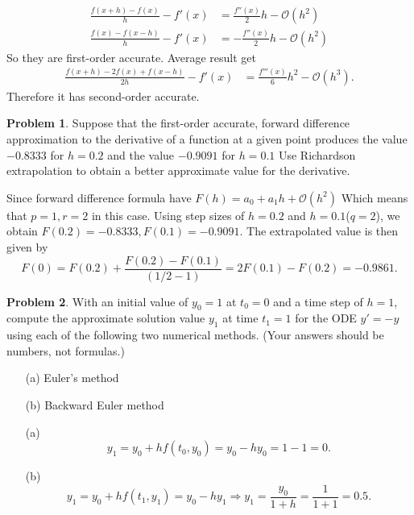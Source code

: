 \documentclass[a4paper]{book}
\makeatletter
\newenvironment{sol}[1][\solname]{\par
  \pushQED{\qed}
  \normalfont \topsep6\p@\@plus6\p@\relax
  \trivlist
  \item[\hskip\labelsep
        \itshape
    #1\@addpunct{.}]\ignorespaces
}{\popQED\endtrivlist\@endpefalse}
\providecommand{\solname}{Solution}
\numberwithin{equation}{chapter}
\theoremstyle{definition}
\newtheorem{pro}{Problem}
\makeatother
\begin{document}
\begin{sol}
    \begin{align*}
        \frac{f(x + h) - f(x)}{h} - f'(x) &= \frac{f''(x)}{2}h - \mathcal{O}(h^2) \\
        \frac{f(x) - f(x - h)}{h} - f'(x) &= - \frac{f''(x)}{2}h - \mathcal{O}(h^2)
    \end{align*}
    So they are first-order accurate. Average result get 
    \begin{align*}
        \frac{f(x + h) - 2f(x) + f(x - h)}{2h} - f'(x) &= \frac{f'''(x)}{6}h^2 - \mathcal{O}(h^3).
    \end{align*}
    Therefore it has second-order accurate.
\end{sol}

\begin{pro}
    Suppose that the first-order accurate, forward difference 
    approximation to the derivative of a function at a given point
    produces the value $-0.8333$ for $h = 0.2$ and the value 
    $-0.9091$ for $h = 0.1$ Use Richardson extrapolation to obtain a better
    approximate value for the derivative.
\end{pro}
\begin{sol}
    Since forward difference formula have $F(h) = a_0 + 
    a_1 h +\mathcal{O}(h^2)$ Which means that $p = 1, r = 2$ in 
    this case. Using step sizes of $h = 0.2$ and $h = 0.1$($ q = 2$),
    we obtain $F(0.2) = -0.8333, F(0.1) = -0.9091$. The 
    extrapolated value is then given by 
    \[F(0) = F(0.2) + \frac{F(0.2) - F(0.1)}{(1/2 - 1)} = 2F(0.1) - F(0.2) = -0.9861.\]
\end{sol}

\begin{pro}
    With an initial value of $y_0=1$ at $t_0=0$
    and a time step of $h=1$,
    compute the approximate solution value $y_1$ at time $t_1 = 1$
    for the ODE $y' = -y$ using each of the following two numerical methods.
    (Your answers should be numbers, not formulas.)
    \begin{itemize}
    \item[(a)]
      Euler's method
  
    \item[(b)]
      Backward Euler method
    \end{itemize}
  \end{pro}
  
  \begin{sol}
    \begin{itemize}
    \item[(a)]
      \begin{displaymath}
        y_1 = y_0+hf(t_0,y_0) = y_0-hy_0 = 1 - 1 = 0.
      \end{displaymath}
  
    \item[(b)]
      \begin{displaymath}
        y_1 = y_0 + hf(t_1, y_1) = y_0-hy_1 \Rightarrow
        y_1 = \frac{y_0}{1+h} = \frac{1}{1+1} = 0.5.
      \end{displaymath}
    \end{itemize}
  \end{sol}
\end{document}
